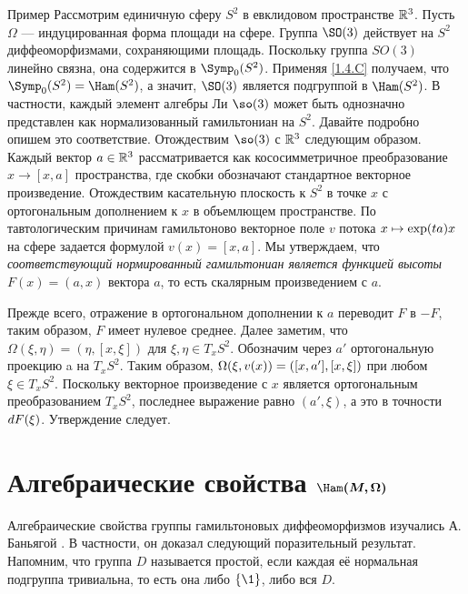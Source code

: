 \begin{thm}{Пример}\label{1.4.H}
Рассмотрим единичную сферу $S^2$ в евклидовом пространстве $\mathbb{R}^3$.
Пусть $\Omega$ --- индуцированная форма площади на сфере.
Группа $\SO(3)$ действует на $S^2$ диффеоморфизмами, сохраняющими площадь.
Поскольку группа $SO(3)$ линейно связна, она содержится в $\Symp_0 (S^2)$.
Применяя \ref{1.4.C} получаем, что $\Symp_0 (S^2) \z= \Ham (S^2)$, а значит, $\SO (3)$ является подгруппой в $\Ham (S^2)$.
В частности, каждый элемент алгебры Ли $\so(3)$ может быть однозначно представлен как нормализованный гамильтониан на $S^2$.
Давайте подробно опишем это соответствие.
Отождествим $\so (3)$ с $\mathbb{R}^3$ следующим образом.
Каждый вектор $a \in \mathbb{R}^3$ рассматривается как кососимметричное преобразование $x \to [x, a]$ пространства, где скобки обозначают стандартное векторное произведение.
Отождествим касательную плоскость к $S^2$ в точке $x$ с ортогональным
дополнением к $x$ в объемлющем пространстве.
По тавтологическим причинам гамильтоново векторное поле $v$ потока $x \z\mapsto \exp (ta) x$ на сфере задается формулой $v (x) = [x, a]$.
Мы утверждаем, что \emph{соответствующий нормированный гамильтониан является
функцией высоты $F(x)=(a,x)$}  вектора $a$, то есть скалярным произведением с $a$.

Прежде всего, отражение в ортогональном дополнении к $a$ переводит $F$ в $-F$, таким образом, $F$ имеет нулевое среднее.
Далее заметим, что $\Omega (\xi, \eta) = (\eta, [x, \xi])$ для $\xi, \eta \in T_x S^2$.
Обозначим через $a'$ ортогональную проекцию a на $T_x S^2$.
Таким образом, $\Omega (\xi, v(x)) \z= ([x, a'], [x, \xi])$ при любом $\xi \in T_x S^2$.
Поскольку векторное произведение с $x$ является ортогональным преобразованием $T_x S^2$, последнее выражение равно $(a', \xi)$,
а это в точности $d F(\xi)$.
Утверждение следует.
\end{thm}

\section[\texorpdfstring{Алгебраические свойства $\Ham(M,\Omega)$}{Алгебраические свойства Ham(M,Ω)}]%
{Алгебраические свойства $\bm{\Ham(M, \Omega)}$}

Алгебраические свойства группы гамильтоновых диффеоморфизмов изучались А. Баньягой \cite{B1,B2}.
В частности, он доказал следующий поразительный результат.
Напомним, что группа $D$ называется простой, если каждая её нормальная подгруппа тривиальна, то есть она либо $\{\1\}$, либо вся $D$.

